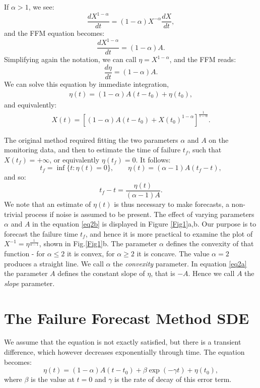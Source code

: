\documentclass{article}
\begin{document}
If $\alpha > 1$, we see:
$$\frac{dX^{1-\alpha}}{dt}=(1-\alpha)X^{-\alpha}\frac{dX}{dt},$$
and the FFM equation becomes:
$$\frac{dX^{1-\alpha}}{dt}=(1-\alpha)A.$$
Simplifying again the notation, we can call $\eta=X^{1-\alpha}$, and the FFM reads:
$$\frac{d\eta}{dt}=(1-\alpha)A.$$
We can solve this equation by immediate integration,
\begin{align}\label{eq2a}
\eta(t)=(1-\alpha)A(t-t_0)+\eta(t_0),
\end{align}
and equivalently:
\begin{align}\label{eq2b}
X(t)=\left[(1-\alpha)A(t-t_0)+X(t_0)^{1-\alpha}\right]^{\frac{1}{1-\alpha}}.
\end{align}

The original method required fitting the two parameters $\alpha$ and $A$ on the monitoring data, and then to estimate the time of failure $t_f$, such that $X(t_f) =+\infty$, or equivalently $\eta(t_f)=0$. It follows:
$$t_f=\inf\{t:\eta(t)=0\}, \quad\quad \eta(t)=(\alpha-1)A(t_f-t),$$
and so:
$$t_f-t=\frac{\eta(t)}{(\alpha-1)A}.$$
We note that an estimate of $\eta(t)$ is thus necessary to make forecasts, a non-trivial process if noise is assumed to be present.
The effect of varying parameters $\alpha$ and $A$ in the equation \ref{eq2b} is displayed in Figure \ref{Fig1}a,b. Our purpose is to forecast the failure time $t_f$, and hence it is more practical to examine the plot of $X^{-1}=\eta^{\frac{1}{\alpha-1}}$, shown in Fig.\ref{Fig1}b. The parameter $\alpha$ defines the convexity of that function - for $\alpha\le2$ it is convex, for $\alpha\ge2$ it is concave. The value $\alpha=2$ produces a straight line. We call $\alpha$ the {\it convexity} parameter. In equation \ref{eq2a} the parameter $A$ defines the constant slope of $\eta$, that is $-A$. Hence we call $A$ the {\it slope} parameter.

\section{The Failure Forecast Method SDE}\label{s2}
We assume that the equation is not exactly satisfied, but there is a transient difference, which however decreases exponentially through time. The equation becomes:
$$\eta(t)=(1-\alpha)A(t-t_0) +\beta\exp(-\gamma t)+\eta(t_0),$$
where $\beta$ is the value at $t=0$ and $\gamma$ is the rate of decay of this error term.
\end{document}
